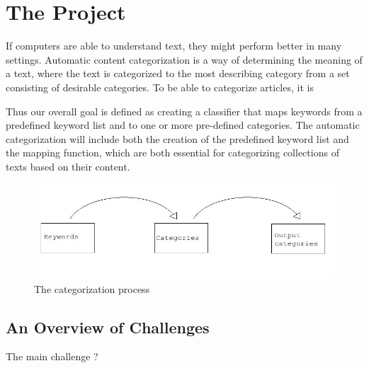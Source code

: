 \section{The Project}
If computers are able to understand text, they might perform better in many settings. Automatic content categorization is a way of determining the meaning of a text, where the text is categorized to the most describing category from a set consisting of desirable categories.
To be able to categorize articles, it is 

Thus our overall goal is defined as creating a classifier that maps keywords from a predefined keyword list and to one or more pre-defined categories. The automatic categorization will include both the creation of the predefined keyword list and the mapping function, which are both essential for categorizing collections of texts based on their content. 

\begin{figure}[H]
\centering
\includegraphics[width=1\textwidth]{classification_process.jpeg}
\caption{The categorization process}
\label{fig:classification_process}
\end{figure}

\subsection{An Overview of Challenges}
The main challenge ?
